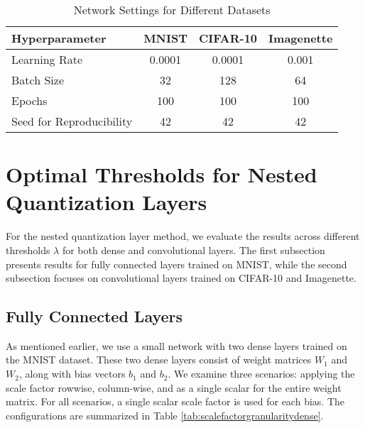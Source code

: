 \begin{table}[h!]
    \centering
    \caption{Network Settings for Different Datasets}
    \label{tab:hyperparameters}
    \begin{tabular}{l|c|c|c}
    \hline
    \textbf{Hyperparameter}     & \textbf{MNIST} & \textbf{CIFAR-10} & \textbf{Imagenette} \\ \hline
    Learning Rate               & 0.0001          & 0.0001             & 0.001              \\ \hline
    Batch Size                  & 32             & 128                & 64                 \\ \hline
    Epochs                      & 100             & 100               & 100                \\ \hline
    Seed for Reproducibility    & 42             & 42                & 42                 \\ \hline
    \end{tabular}
\end{table}



\section{Optimal Thresholds for Nested Quantization Layers}
\label{sec:paretofronts}
For the nested quantization layer method, we evaluate the results across different thresholds \( \lambda \)
for both dense and convolutional layers. The first subsection presents results for fully connected layers trained on MNIST,
while the second subsection focuses on convolutional layers trained on CIFAR-10 and Imagenette.

\subsection{Fully Connected Layers}
\label{subsec:paretofrontsdense}
As mentioned earlier, we use a small network with two dense layers trained on the MNIST dataset. 
These two dense layers consist of weight matrices \( W_1 \) and \( W_2 \),
along with bias vectors \( b_1 \) and \( b_2 \).
We examine three scenarios:
applying the scale factor rowwise, 
column-wise, and as a single scalar for the entire weight matrix.
For all scenarios, a single scalar scale factor is used for each bias. 
The configurations are summarized in Table \ref{tab:scalefactorgranularitydense}.

